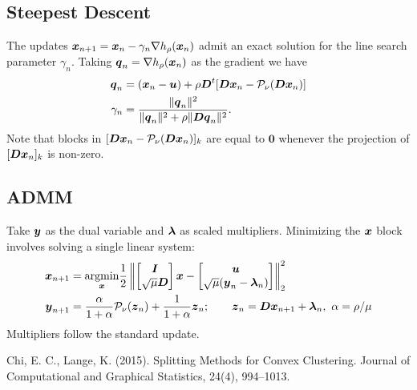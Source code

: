 \documentclass[11pt]{article}
\begin{document}
\subsection*{Steepest Descent}

The updates $\boldsymbol{x}_{n+1} = \boldsymbol{x}_{n} - \gamma_{n} \nabla h_{\rho}(\boldsymbol{x}_{n})$ admit an exact solution for the line search parameter $\gamma_{n}$.
Taking $\boldsymbol{q}_{n} = \nabla h_{\rho}(\boldsymbol{x}_{n})$ as the gradient we have
\begin{align*}
  \boldsymbol{q}_{n}
  &= (\boldsymbol{x}_{n} - \boldsymbol{u}) + \rho \boldsymbol{D}^{t} [\boldsymbol{D} \boldsymbol{x}_{n} - \mathcal{P}_{\nu}(\boldsymbol{D} \boldsymbol{x}_{n})] \\
  \gamma_{n}
  &=
  \frac{\|\boldsymbol{q}_{n}\|^{2}}{\|\boldsymbol{q}_{n}\|^{2} + \rho \|\boldsymbol{D} \boldsymbol{q}_{n}\|^{2}}.
\end{align*}
Note that blocks in $[\boldsymbol{D} \boldsymbol{x}_{n} - \mathcal{P}_{\nu}(\boldsymbol{D}\boldsymbol{x}_{n})]_{k}$ are equal to $\boldsymbol{0}$ whenever the projection of $[\boldsymbol{D} \boldsymbol{x}_{n}]_{k}$ is non-zero.

\subsection*{ADMM}

Take $\boldsymbol{y}$ as the dual variable and $\boldsymbol{\lambda}$ as scaled multipliers.
Minimizing the $\boldsymbol{x}$ block involves solving a single linear system:
\begin{align*}
    \boldsymbol{x}_{n+1}
    &=
    \underset{\boldsymbol{x}}{\mathop{\rm argmin}\nolimits} \frac{1}{2} \left\|
        \begin{bmatrix}
        \boldsymbol{I} \\
        \sqrt{\mu} \boldsymbol{D}
        \end{bmatrix} \boldsymbol{x}
        -
        \begin{bmatrix}
        \boldsymbol{u} \\
        \sqrt{\mu} (\boldsymbol{y}_{n} - \boldsymbol{\lambda}_{n})
        \end{bmatrix}
    \right\|_{2}^{2} \\
    \boldsymbol{y}_{n+1}
    &= \frac{\alpha}{1+\alpha} \mathcal{P}_{\nu}(\boldsymbol{z}_{n}) + \frac{1}{1+\alpha} \boldsymbol{z}_{n};
    \qquad \boldsymbol{z}_{n} = \boldsymbol{D} \boldsymbol{x}_{n+1} + \boldsymbol{\lambda}_{n},~\alpha = \rho / \mu
    \end{align*}
Multipliers follow the standard update.

\begin{thebibliography}{1}
    Chi, E. C., Lange, K. (2015). {Splitting Methods for Convex Clustering}. {Journal of Computational and Graphical Statistics}, 24(4), 994–1013.
\end{thebibliography}
\end{document}
